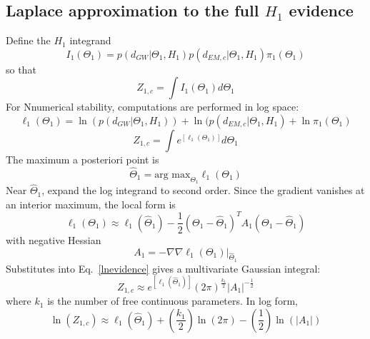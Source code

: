 \documentclass[pdflatex,sn-mathphys-num]{sn-jnl}%
\theoremstyle{thmstyleone}%
\theoremstyle{thmstyletwo}%
\theoremstyle{thmstylethree}%
\begin{document}
\begin{appendices}
\section{Laplace approximation to the full $H_1$ evidence}
Define the $H_1$ integrand
\begin{equation}
I_1(\Theta_1) = p(d_{GW}|\Theta_1,H_1)p(d_{EM,c}|\Theta_1,H_1)\pi_1(\Theta_1)
\end{equation}
so that
\begin{equation}
Z_{1,c} = \int I_1(\Theta_1)d\Theta_1
\end{equation}
For Nnumerical stability, computations are performed in log space:
\begin{equation}
\ell_1(\Theta_1) = \ln(p(d_{GW}|\Theta_1,H_1))+\ln(p(d_{EM,c}|\Theta_1,H_1)+\ln\pi_1(\Theta_1)
\end{equation}
\begin{equation}
\label{lnevidence}
Z_{1,c} = \int e^{[\ell_1(\Theta_1)]}d\Theta_1
\end{equation}
The maximum a posteriori point is
\begin{equation}
\hat\Theta_1 = \text{arg max}_{\Theta_1}\ell_1(\Theta_1)
\end{equation}
Near $\hat\Theta_1$, expand the log integrand to second order.
Since the gradient vanishes at an interior maximum, the local form is
\begin{equation}
\ell_1(\Theta_1) \approx \ell_1(\hat\Theta_1) - \frac{1}{2}(\Theta_1-\hat\Theta_1)^TA_1(\Theta_1-\hat\Theta_1)
\end{equation}
with negative Hessian
\begin{equation}
A_1 = -\nabla\nabla\ell_1(\Theta_1)|_{\hat\Theta_1}
\end{equation}
Substitutes into Eq.~\eqref{lnevidence} gives a multivariate Gaussian integral:
\begin{equation}
Z_{1,c} \approx e^{[\ell_1(\hat\Theta_1)]}(2\pi)^{\frac{k_1}{2}}|A_1|^{-\frac{1}{2}}
\end{equation}
where $k_1$ is the number of free continuous parameters.
In log form,
\begin{equation}
\ln(Z_{1,c}) \approx \ell_1(\hat\Theta_1)+(\frac{k_1}{2})\ln(2\pi)-(\frac{1}{2})\ln(|A_1|)
\end{equation}


\end{appendices}
\end{document}
